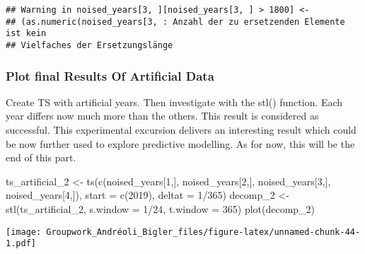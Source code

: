 \documentclass[
]{article}
\newenvironment{Shaded}{\begin{snugshade}}{\end{snugshade}}
\newcommand{\AttributeTok}[1]{\textcolor[rgb]{0.77,0.63,0.00}{#1}}
\newcommand{\DecValTok}[1]{\textcolor[rgb]{0.00,0.00,0.81}{#1}}
\newcommand{\FunctionTok}[1]{\textcolor[rgb]{0.00,0.00,0.00}{#1}}
\newcommand{\NormalTok}[1]{#1}
\newcommand{\OtherTok}[1]{\textcolor[rgb]{0.56,0.35,0.01}{#1}}
\newcommand{\SpecialCharTok}[1]{\textcolor[rgb]{0.00,0.00,0.00}{#1}}
\begin{document}
\begin{verbatim}
## Warning in noised_years[3, ][noised_years[3, ] > 1800] <-
## (as.numeric(noised_years[3, : Anzahl der zu ersetzenden Elemente ist kein
## Vielfaches der Ersetzungslänge
\end{verbatim}

\hypertarget{plot-final-results-of-artificial-data}{%
\subsubsection{Plot final Results Of Artificial
Data}\label{plot-final-results-of-artificial-data}}

Create TS with artificial years. Then investigate with the stl()
function. Each year differs now much more than the others. This result
is considered as successful. This experimental excursion delivers an
interesting result which could be now further used to explore predictive
modelling. As for now, this will be the end of this part.

\begin{Shaded}
\begin{Highlighting}[]
\NormalTok{ts\_artificial\_2 }\OtherTok{\textless{}{-}} \FunctionTok{ts}\NormalTok{(}\FunctionTok{c}\NormalTok{(noised\_years[}\DecValTok{1}\NormalTok{,], noised\_years[}\DecValTok{2}\NormalTok{,], noised\_years[}\DecValTok{3}\NormalTok{,], noised\_years[}\DecValTok{4}\NormalTok{,]), }\AttributeTok{start =} \FunctionTok{c}\NormalTok{(}\DecValTok{2019}\NormalTok{), }\AttributeTok{deltat =} \DecValTok{1}\SpecialCharTok{/}\DecValTok{365}\NormalTok{)}
\NormalTok{decomp\_2 }\OtherTok{\textless{}{-}} \FunctionTok{stl}\NormalTok{(ts\_artificial\_2, }\AttributeTok{s.window =} \DecValTok{1}\SpecialCharTok{/}\DecValTok{24}\NormalTok{, }\AttributeTok{t.window =} \DecValTok{365}\NormalTok{)}
\FunctionTok{plot}\NormalTok{(decomp\_2)}
\end{Highlighting}
\end{Shaded}

\texttt{[image: Groupwork\_Andréoli\_Bigler\_files/figure-latex/unnamed-chunk-44-1.pdf]}
\end{document}
